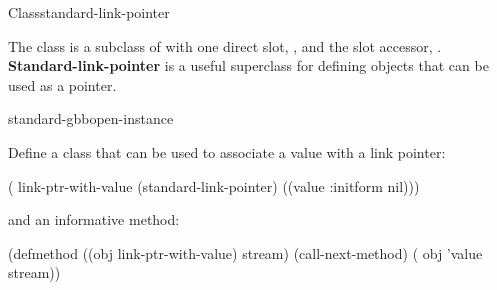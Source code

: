 \documentclass[10pt,twoside,english,pdftex]{article}
\begin{document}
\begin{functiondoc}{Class}{standard-link-pointer}{}
%
 
\fnsyntax

\fnpackage {}

\fnmodule {}

\fndescription {}%
%
The class  is a subclass of
 with one direct slot,
, and the slot accessor,
.  \textbf{Standard-link-pointer} is
a useful superclass for defining objects that can be used as a 
pointer.

\begin{alsos}{standard-gbbopen-instance}
\also[linkf]
\also[unlinkf]
\end{alsos}

\fnexample
%
%
%
%
\label{link-ptr-class}%
Define a  class that can be used to associate a value
with a link pointer:
%
\W\supp
\begin{example}
  ( link-ptr-with-value (standard-link-pointer)
     ((value :initform nil)))
\end{example}
%
%
%
and an informative  method:
%
\W\supp\notpretop
\begin{example}
  (defmethod  ((obj link-ptr-with-value) stream)
    (call-next-method)
    ( obj 'value stream))
\end{example}

\end{functiondoc}

\end{document}
